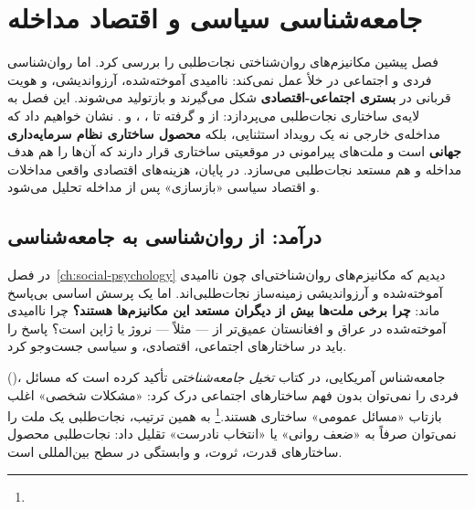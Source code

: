 \chapter{جامعه‌شناسی سیاسی و اقتصاد مداخله}
\label{ch:sociology-economics}

\begin{tcolorbox}[mybox, title={چکیده‌ی فصل}]
فصل پیشین مکانیزم‌های روان‌شناختی نجات‌طلبی را بررسی کرد. اما روان‌شناسی فردی و اجتماعی در خلأ عمل نمی‌کند: ناامیدی آموخته‌شده، آرزواندیشی، و هویت قربانی در \textbf{بستری اجتماعی-اقتصادی} شکل می‌گیرند و بازتولید می‌شوند. این فصل به لایه‌ی ساختاری نجات‌طلبی می‌پردازد: از  و  گرفته تا ، ، و . نشان خواهیم داد که مداخله‌ی خارجی نه یک رویداد استثنایی، بلکه \textbf{محصول ساختاری نظام سرمایه‌داری جهانی} است و ملت‌های پیرامونی در موقعیتی ساختاری قرار دارند که آن‌ها را هم هدف مداخله و هم مستعد نجات‌طلبی می‌سازد. در پایان، هزینه‌های اقتصادی واقعی مداخلات و اقتصاد سیاسی «بازسازی» پس از مداخله تحلیل می‌شود.
\end{tcolorbox}

\section{درآمد: از روان‌شناسی به جامعه‌شناسی}
\label{sec:ch12-intro}

در فصل~\ref{ch:social-psychology} دیدیم که مکانیزم‌های روان‌شناختی‌ای چون ناامیدی آموخته‌شده و آرزواندیشی زمینه‌ساز نجات‌طلبی‌اند. اما یک پرسش اساسی بی‌پاسخ ماند: \textbf{چرا برخی ملت‌ها بیش از دیگران مستعد این مکانیزم‌ها هستند؟} چرا ناامیدی آموخته‌شده در عراق و افغانستان عمیق‌تر از — مثلاً — نروژ یا ژاپن است؟ پاسخ را باید در ساختارهای اجتماعی، اقتصادی، و سیاسی جست‌وجو کرد.

 ()، جامعه‌شناس آمریکایی، در کتاب \textit{تخیل جامعه‌شناختی} تأکید کرده است که مسائل فردی را نمی‌توان بدون فهم ساختارهای اجتماعی درک کرد: «مشکلات شخصی» اغلب بازتاب «مسائل عمومی» ساختاری هستند.\footnote{} به همین ترتیب، نجات‌طلبی یک ملت را نمی‌توان صرفاً به «ضعف روانی» یا «انتخاب نادرست» تقلیل داد: نجات‌طلبی محصول ساختارهای قدرت، ثروت، و وابستگی در سطح بین‌المللی است.

